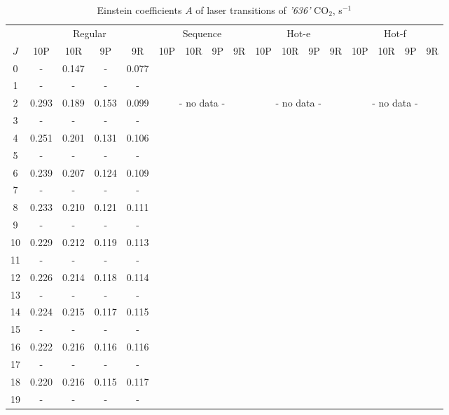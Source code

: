 \documentclass{report}
\begin{document}
\begin{table}
\centering
\caption{Einstein coefficients $A$ of laser transitions of \textit{'636'} CO$_2$, s$^{-1}$}
\label{table:A636}
\scriptsize
\begin{tabular}{|c|cccc|cccc|cccc|cccc|}
\hline
& \multicolumn{4}{c|}{Regular}& \multicolumn{4}{c|}{Sequence}& \multicolumn{4}{c|}{Hot-e}& \multicolumn{4}{c|}{Hot-f}\\
$J$ & 10P & 10R & 9P & 9R & 10P & 10R & 9P & 9R & 10P & 10R & 9P & 9R & 10P & 10R & 9P & 9R\\ 
\hline
0  &   -   & 0.147 &   -   & 0.077 & & & & & & & & & & & &\\
1  &   -   &   -   &   -   &   -   & & & & & & & & & & & &\\
2  & 0.293 & 0.189 & 0.153 & 0.099 & \multicolumn{4}{c|}{- no data -}& \multicolumn{4}{c|}{- no data -}& \multicolumn{4}{c|}{- no data -}\\
3  &   -   &   -   &   -   &   -   & & & & & & & & & & & &\\
4  & 0.251 & 0.201 & 0.131 & 0.106 & & & & & & & & & & & &\\
5  &   -   &   -   &   -   &   -   & & & & & & & & & & & &\\
6  & 0.239 & 0.207 & 0.124 & 0.109 & & & & & & & & & & & &\\
7  &   -   &   -   &   -   &   -   & & & & & & & & & & & &\\
8  & 0.233 & 0.210 & 0.121 & 0.111 & & & & & & & & & & & &\\
9  &   -   &   -   &   -   &   -   & & & & & & & & & & & &\\
10 & 0.229 & 0.212 & 0.119 & 0.113 & & & & & & & & & & & &\\
11 &   -   &   -   &   -   &   -   & & & & & & & & & & & &\\
12 & 0.226 & 0.214 & 0.118 & 0.114 & & & & & & & & & & & &\\
13 &   -   &   -   &   -   &   -   & & & & & & & & & & & &\\
14 & 0.224 & 0.215 & 0.117 & 0.115 & & & & & & & & & & & &\\
15 &   -   &   -   &   -   &   -   & & & & & & & & & & & &\\
16 & 0.222 & 0.216 & 0.116 & 0.116 & & & & & & & & & & & &\\
17 &   -   &   -   &   -   &   -   & & & & & & & & & & & &\\
18 & 0.220 & 0.216 & 0.115 & 0.117 & & & & & & & & & & & &\\
19 &   -   &   -   &   -   &   -   & & & & & & & & & & & &\\

\end{tabular}
\end{table}
\end{document}
